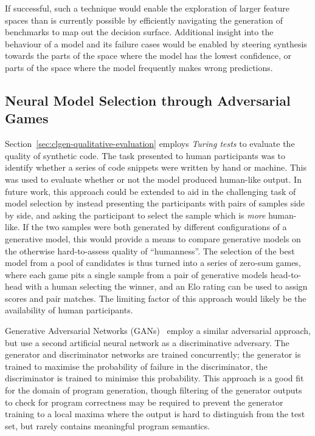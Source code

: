 If successful, such a technique would enable the exploration of larger feature spaces than is currently possible by efficiently navigating the generation of benchmarks to map out the decision surface. Additional insight into the behaviour of a model and its failure cases would be enabled by steering synthesis towards the parts of the space where the model has the lowest confidence, or parts of the space where the model frequently makes wrong predictions.


\subsection{Neural Model Selection through Adversarial Games}

Section~\ref{sec:clgen-qualitative-evaluation} employs \emph{Turing tests} to evaluate the quality of synthetic code. The task presented to human participants was to identify whether a series of code snippets were written by hand or machine. This was used to evaluate whether or not the model produced human-like output. In future work, this approach could be extended to aid in the challenging task of model selection by instead presenting the participants with pairs of samples side by side, and asking the participant to select the sample which is \emph{more} human-like. If the two samples were both generated by different configurations of a generative model, this would provide a means to compare generative models on the otherwise hard-to-assess quality of ``humanness''. The selection of the best model from a pool of candidates is thus turned into a series of zero-sum games, where each game pits a single sample from a pair of generative models head-to-head with a human selecting the winner, and an Elo rating can be used to assign scores and pair matches. The limiting factor of this approach would likely be the availability of human participants.

Generative Adversarial Networks (GANs)~\cite{Goodfellow2014} employ a similar adversarial approach, but use a second artificial neural network as a discriminative adversary. The generator and discriminator networks are trained concurrently; the generator is trained to maximise the probability of failure in the discriminator, the discriminator is trained to minimise this probability. This approach is a good fit for the domain of program generation, though filtering of the generator outputs to check for program correctness may be required to prevent the generator training to a local maxima where the output is hard to distinguish from the test set, but rarely contains meaningful program semantics.


